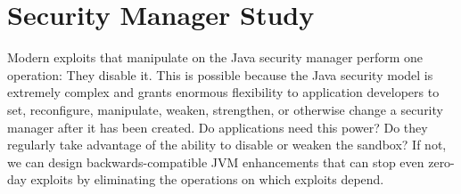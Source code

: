 \documentclass{sig-alternate}
\begin{document}


\section{Security Manager Study}\label{sec:Security-Manager-Study}

Modern exploits that manipulate on the Java security manager perform one
operation: They disable it.  This is possible because the Java security model is extremely
complex and grants enormous flexibility to application developers to
set, reconfigure, manipulate, weaken, strengthen, or otherwise change a security
manager after it has been created.
Do applications need this power?  Do they regularly take advantage of the
ability to disable or weaken the sandbox?  If not, we can design
backwards-compatible JVM enhancements that can stop even zero-day exploits by
eliminating the operations on which exploits depend.   
\end{document}
